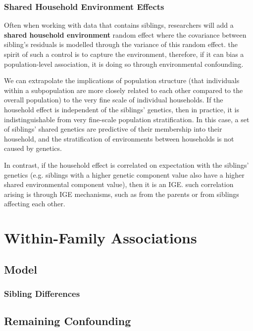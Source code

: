 \documentclass[12pt]{article}
\begin{document}
\subsubsection{Shared Household Environment Effects}
Often when working with data that contains siblings, researchers will add a \textbf{shared household environment} random effect where the covariance between sibling's residuals is modelled through the variance of this random effect.
 the spirit of such a control is to capture the environment, therefore, if it can bias a population-level association, it is doing so through environmental confounding.

We can extrapolate the implications of population structure (that individuals within a subpopulation are more closely related to each other compared to the overall population) to the very fine scale of individual households.
If the household effect is independent of the siblings' genetics, then in practice, it is indistinguishable from very fine-scale population stratification.
In this case, a set of siblings' shared genetics are predictive of their membership into their household, and the stratification of environments between households is not caused by genetics.

In contrast, if the household effect is correlated on expectation with the siblings' genetics (e.g. siblings with a higher genetic component value also have a higher shared environmental component value), then it is an IGE.
 such correlation arising is through IGE mechanisms, such as from the parents or from siblings affecting each other.

\section{Within-Family Associations}

\subsection{Model}



\subsubsection{Sibling Differences}

\subsection{Remaining Confounding}






\end{document}
